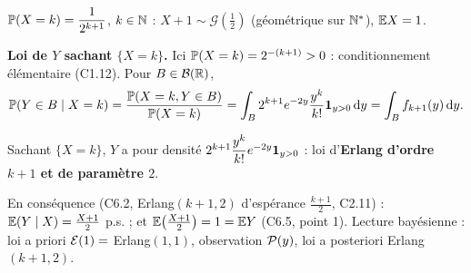 \documentclass[11pt,a4paper]{article}
\newcommand{\Geo}{\mathcal{G}}
\begin{document}
\begin{exo}
\begin{resultat}
$\mathbb{P}(X=k)=\dfrac1{2^{k+1}}$, $k\in\mathbb{N}$ : $X+1\sim\Geo(\tfrac12)$ (géométrique sur $\mathbb{N}^*$), $\mathbb{E} X=1$.
\end{resultat}

\textbf{Loi de $Y$ sachant $\{X=k\}$.} Ici $\mathbb{P}(X=k)=2^{-(k+1)}>0$ : conditionnement élémentaire (C1.12). Pour $B\in\mathcal{B}(\mathbb{R})$,
\[\mathbb{P}(Y\in B\mid X=k)=\frac{\mathbb{P}(X=k,Y\in B)}{\mathbb{P}(X=k)}=\int_B2^{k+1}e^{-2y}\frac{y^k}{k!}\mathbf{1}_{y>0}\,\mathrm{d} y=\int_Bf_{k+1}(y)\,\mathrm{d} y .\]

\begin{resultat}
Sachant $\{X=k\}$, $Y$ a pour densité $2^{k+1}\dfrac{y^k}{k!}e^{-2y}\mathbf{1}_{y>0}$ : loi d'\textbf{Erlang d'ordre $k+1$ et de paramètre $2$}.
\end{resultat}

\begin{remarque}
En conséquence (C6.2, Erlang$(k+1,2)$ d'espérance $\frac{k+1}2$, C2.11) : $\mathbb{E}(Y\mid X)=\frac{X+1}2$ p.s. ; et
$\mathbb{E}\bigl(\frac{X+1}2\bigr)=1=\mathbb{E} Y$ (C6.5, point 1). Lecture bayésienne : loi a priori $\mathcal{E}(1)=$ Erlang$(1,1)$, observation $\mathcal{P}(y)$,
loi a posteriori Erlang$(k+1,2)$.
\end{remarque}
\end{exo}
\end{document}
